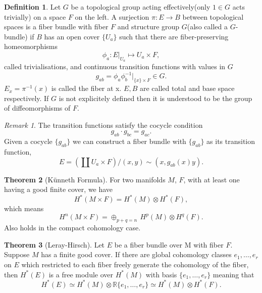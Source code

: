 \documentclass[twocolumn]{article}
\theoremstyle{definition}
\newtheorem{definition}{Definition}[section]
\newtheorem{theorem}[definition]{Theorem}
\theoremstyle{remark}
\newtheorem*{remark}{Remark}
\begin{document}
\begin{definition}
    Let $G$ be a topological group acting effectively(only $1\in G$ acts trivially) on a space $F$ on the left. A surjection $\pi: E \rightarrow B$ between topological spaces is a fiber bundle with fiber $F$
    and structure group $G$(also called a $G$-bundle) if $B$ has an open cover $\{U_a\}$ such that there are fiber-preserving homeomorphisms
    \begin{equation}
        \phi_a : E |_{U_a} \mapsto U_a \times F,
    \end{equation}
    called trivialisations, and continuous transition functions with values in $G$
    \begin{equation}
        g_{ab} = \phi_a\phi_b^{-1} |_{\{x\} \times F} \in G.
    \end{equation}
    $E_x = \pi^{-1}(x)$ is called the fiber at x. $E, B$ are called total and base space respectively.
    If $G$ is not explicitely defined then it is understood to be the group of diffeomorphisms of $F$.
\end{definition}
\begin{remark}
    The transition functions satisfy the cocycle condition
    \begin{equation}
        g_{ab} \cdot g_{bc} = g_{ac}.
    \end{equation}
    Given a cocycle $\{g_{ab}\}$ we can construct a fiber bundle with $\{g_{ab}\}$ as its transition function,
    \begin{equation}
        E=\left(\coprod U_a \times F\right) / (x, y) \sim (x, g_{ab}(x)y).
    \end{equation}
\end{remark}
\begin{theorem}[Künneth Formula]
    For two manifolds $M$, $F$, with at least one having a good finite cover, we have
    \begin{equation}
        H^*(M\times F) = H^*(M) \otimes H^*(F),
    \end{equation}
    which means
    \begin{equation}
        H^n(M\times F) = \oplus_{p+q=n}\, H^p(M) \otimes H^q(F).
    \end{equation}
    Also holds in the compact cohomology case.
\end{theorem}
\begin{theorem}[Leray-Hirsch]
    Let $E$ be a fiber bundle over M with fiber $F$. Suppose $M$ has a finite good cover.
    If there are global cohomology classes $e_1, \dots, e_r$ on $E$ which restricted to each fiber freely generate
    the cohomology of the fiber, then $H^*(E)$ is a free module over $H^*(M)$ with basis $\{e_1, \dots, e_r\}$ meaning that
    \begin{equation}
        H^*(E) \simeq H^*(M) \otimes \mathbb{R}\{e_1, \dots, e_r\} \simeq H^*(M) \otimes H^*(F).
    \end{equation}
\end{theorem}
\end{document}
